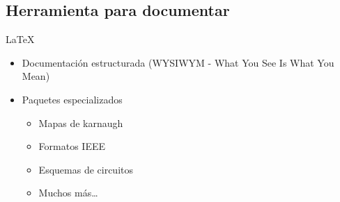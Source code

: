 \documentclass{beamer}
\begin{document}

  






\subsection{Herramienta para documentar}

\begin{frame}{\LaTeX}
  \begin{itemize}
  \item Documentación estructurada (WYSIWYM - What You See Is What You Mean)
  \item Paquetes especializados
    \begin{itemize}
    \item Mapas de karnaugh
    \item Formatos IEEE
    \item Esquemas de circuitos
    \item Muchos más\dots
    \end{itemize}

  \end{itemize}
\end{frame}
\end{document}
